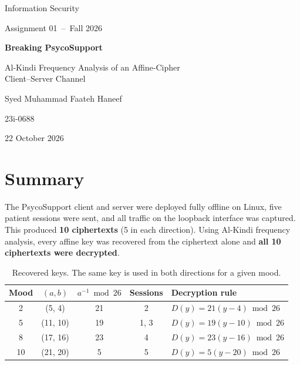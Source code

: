 \documentclass[11pt,a4paper]{article}
\DeclareRobustCommand{\_}{\textunderscore\allowbreak}  %
\begin{document}
\begin{titlepage}
\centering
\vspace*{3.5cm}
{\Large Information Security\par}
{\large Assignment 01 \,--\, Fall 2026\par}
\vspace{1.8cm}
{\huge\bfseries Breaking PsycoSupport\par}
\vspace{0.4cm}
{\Large Al-Kindi Frequency Analysis of an Affine-Cipher\\Client--Server Channel\par}
\vspace{2.5cm}
{\large Syed Muhammad Faateh Haneef\par}
{\large 23i-0688\par}
\vfill
{\large 22 October 2026\par}
\end{titlepage}

\tableofcontents
\newpage

\section*{Summary}

The PsycoSupport client and server were deployed fully offline on Linux, five patient sessions were sent, and
all traffic on the loopback interface was captured. This produced \textbf{10 ciphertexts} (5 in each direction).
Using Al-Kindi frequency analysis, every affine key was recovered from the ciphertext alone and \textbf{all 10
ciphertexts were decrypted}.

\begin{table}[H]\centering
\caption{Recovered keys. The same key is used in both directions for a given mood.}
\begin{tabular}{c c c c l}
\toprule
Mood & $(a,b)$ & $a^{-1} \bmod 26$ & Sessions & Decryption rule \\
\midrule
2  & (5, 4)   & 21 & 2    & $D(y)=21(y-4) \bmod 26$ \\
5  & (11, 10) & 19 & 1, 3 & $D(y)=19(y-10) \bmod 26$ \\
8  & (17, 16) & 23 & 4    & $D(y)=23(y-16) \bmod 26$ \\
10 & (21, 20) & 5  & 5    & $D(y)=5(y-20) \bmod 26$ \\
\bottomrule
\end{tabular}
\end{table}
\end{document}
